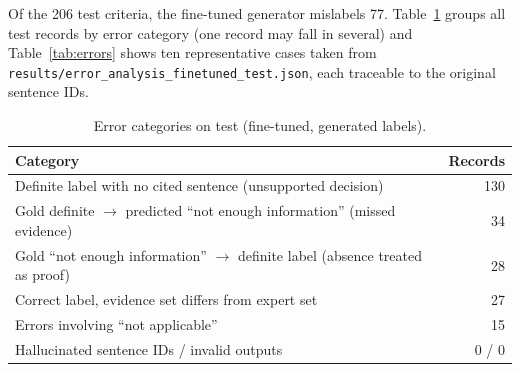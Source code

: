 Of the 206 test criteria, the fine-tuned generator mislabels 77. Table~\ref{tab:errcats} groups all test records by error category (one record may fall in several) and Table~\ref{tab:errors} shows ten representative cases taken from \texttt{results/error\_analysis\_finetuned\_test.json}, each traceable to the original sentence IDs.

\begin{table}[t]\centering\caption{Error categories on test (fine-tuned, generated labels).}\label{tab:errcats}
\setlength{\tabcolsep}{3pt}
\begin{tabular}{lr}\toprule
Category & Records\\\midrule
Definite label with no cited sentence (unsupported decision) & 130\\
Gold definite $\rightarrow$ predicted ``not enough information'' (missed evidence) & 34\\
Gold ``not enough information'' $\rightarrow$ definite label (absence treated as proof) & 28\\
Correct label, evidence set differs from expert set & 27\\
Errors involving ``not applicable'' & 15\\
Hallucinated sentence IDs / invalid outputs & 0 / 0\\
\bottomrule\end{tabular}\end{table}

